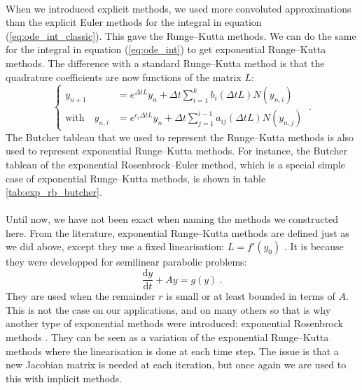     \paragraph{}
    When we introduced explicit methods, we used more convoluted approximations than the explicit Euler methods for the integral in equation (\ref{eq:ode_int_classic}).
    This gave the Runge--Kutta methods.
    We can do the same for the integral in equation (\ref{eq:ode_int}) to get exponential Runge--Kutta methods.
    The difference with a standard Runge--Kutta method is that the quadrature coefficients are now functions of the matrix $L$:
    \begin{equation}
      \left\{\begin{aligned}
        y_{n+1} &= e^{\Delta t L} y_n + \Delta t \sum_{i = 1}^k b_i\left(\Delta t L\right) N\left(y_{n,i}\right) \\
        \textrm{with}\quad y_{n,i} &= e^{c_i \Delta t L} y_n + \Delta t \sum_{j = 1}^{i-1} a_{ij}\left(\Delta t L\right) N\left(y_{n,j}\right)
      \end{aligned}\right. \ .
    \end{equation}
    The Butcher tableau that we used to represent the Runge--Kutta methods is also used to represent exponential Runge--Kutta methods.
    For instance, the Butcher tableau of the exponential Rosenbrock--Euler method, which is a special simple case of exponential Runge--Kutta methods, is shown in table \ref{tab:exp_rb_butcher}.

    \paragraph{}
    Until now, we have not been exact when naming the methods we constructed here.
    From the literature, exponential Runge--Kutta methods are defined just as we did above, except they use a fixed linearisation: $L = f'\left(y_0\right)$ \cite{HochbruckOstermann2005}.
    It is because they were developped for semilinear parabolic problems:
    \begin{equation}
      \frac{\mathrm{d} y}{\mathrm{d} t} + Ay = g\left(y\right) \ .
    \end{equation}
    They are used when the remainder $r$ is small or at least bounded in terms of $A$.
    This is not the case on our applications, and on many others so that is why another type of exponential methods were introduced: exponential Rosenbrock methods \cite{HochbruckOstermannSchweitzer2006}.
    They can be seen as a variation of the exponential Runge--Kutta methods where the linearisation is done at each time step.
    The issue is that a new Jacobian matrix is needed at each iteration, but once again we are used to this with implicit methods.

